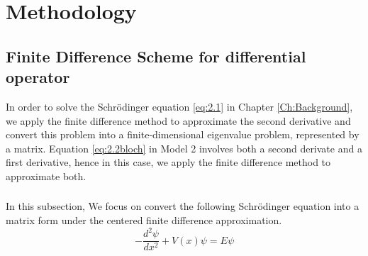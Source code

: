 \chapter{Methodology}\label{Ch:Methodology}



\section{Finite Difference Scheme for differential operator}
In order to solve the Schr\"{o}dinger equation \ref{eq:2.1} in Chapter \ref{Ch:Background}, we apply the finite difference method to approximate the second derivative and convert this problem into a finite-dimensional eigenvalue problem, represented by a matrix. 
Equation \ref{eq:2.2bloch} in Model 2 involves both a second derivate and a first derivative, hence in this case, we apply the finite difference method to approximate both. 


\subsection{}
In this subsection, We focus on convert the following Schr\"{o}dinger equation into a matrix form under the centered finite difference approximation.  
\begin{equation} \label{eq:3.1}
-\frac{d^2\psi}{dx^2}+V(x)\psi=E\psi
\end{equation}

